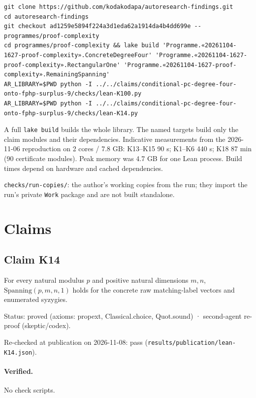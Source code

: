 \documentclass{article}
\begin{document}
\begin{verbatim}
git clone https://github.com/kodakodapa/autoresearch-findings.git
cd autoresearch-findings
git checkout ad1259e5894f224a3d1eda62a1914da4b4dd699e -- programmes/proof-complexity
cd programmes/proof-complexity && lake build 'Programme.«20261104-1627-proof-complexity».ConcreteDegreeFour' 'Programme.«20261104-1627-proof-complexity».RectangularOne' 'Programme.«20261104-1627-proof-complexity».RemainingSpanning'
AR_LIBRARY=$PWD python -I ../../claims/conditional-pc-degree-four-onto-fphp-surplus-9/checks/lean-K100.py
AR_LIBRARY=$PWD python -I ../../claims/conditional-pc-degree-four-onto-fphp-surplus-9/checks/lean-K14.py
\end{verbatim}

A full \texttt{lake build} builds the whole library. The named targets build only the claim modules and their dependencies. Indicative measurements from the 2026-11-06 reproduction on 2 cores / 7.8 GB: K13--K15 90 s; K1--K6 440 s; K18 87 min (90 certificate modules). Peak memory was 4.7 GB for one Lean process. Build times depend on hardware and cached dependencies.

\texttt{checks/run-copies/}: the author's working copies from the run; they import the run's private \texttt{Work} package and are not built standalone.

\section{Claims}

\subsection*{Claim K14}

For every natural modulus $p$ and positive natural dimensions $m,n$, $\mathrm{Spanning}(p,m,n,1)$ holds for the concrete raw matching-label vectors and enumerated syzygies.

Status: proved (axioms: propext, Classical.choice, Quot.sound) · second-agent re-proof (skeptic/codex).

Re-checked at publication on 2026-11-08: pass (\texttt{results/publication/lean-K14.json}).

\paragraph{Verified.}
No check scripts.
\end{document}
